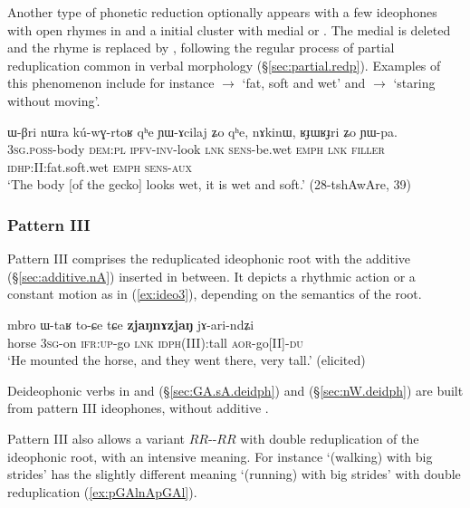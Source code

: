 Another type of phonetic reduction optionally appears with a few ideophones with open rhymes in  and a initial cluster with medial  or . The medial is deleted and the rhyme is replaced by , following the regular process of partial reduplication common in verbal morphology (§\ref{sec:partial.redp}). Examples of this phenomenon include for instance  $\rightarrow$  `fat, soft and wet' and   $\rightarrow$  `staring without moving'.

  \begin{exe} 
\ex  \label{ex:RJWRJri}
\gll ɯ-βri nɯra kú-wɣ-rtoʁ qʰe ɲɯ-ɤcilaj ʑo qʰe, nɤkinɯ, ʁɟɯʁɟri ʑo ɲɯ-pa. \\
\textsc{3sg}.\textsc{poss}-body \textsc{dem}:\textsc{pl} \textsc{ipfv}-\textsc{inv}-look \textsc{lnk} \textsc{sens}-be.wet \textsc{emph} \textsc{lnk} \textsc{filler} \textsc{idhp}:II:fat.soft.wet \textsc{emph} \textsc{sens}-\textsc{aux} \\
\glt `The body [of the gecko] looks wet, it is wet and soft.' (28-tshAwAre, 39)
  \end{exe}

\subsubsection{Pattern III} \label{sec:ideo.III}
  Pattern III comprises the reduplicated ideophonic root with the additive   (§\ref{sec:additive.nA}) inserted in between. It depicts a rhythmic action  or a constant motion as in (\ref{ex:ideo3}), depending on the semantics of the root.   
  
 \begin{exe} 
\ex  \label{ex:ideo3}
\gll  mbro ɯ-taʁ to-ɕe tɕe \textbf{zjaŋnɤzjaŋ} jɤ-ari-ndʑi   \\
horse \textsc{3sg}-on  \textsc{ifr}:\textsc{up}-go \textsc{lnk} \textsc{idph}(III):tall  \textsc{aor}-go[II]-\textsc{du} \\
\glt `He mounted the horse, and  they went there, very tall.'  (elicited)
 \end{exe} 
 
 Deideophonic verbs in  and  (§\ref{sec:GA.sA.deidph}) and  (§\ref{sec:nW.deidph}) are built from pattern III ideophones, without additive .
 
  Pattern III also allows a variant $RR$--$RR$ with double reduplication of the ideophonic root, with an intensive meaning. For instance  `(walking) with big strides' has the slightly different meaning `(running) with big strides' with double reduplication (\ref{ex:pGAlnApGAl}).
  
